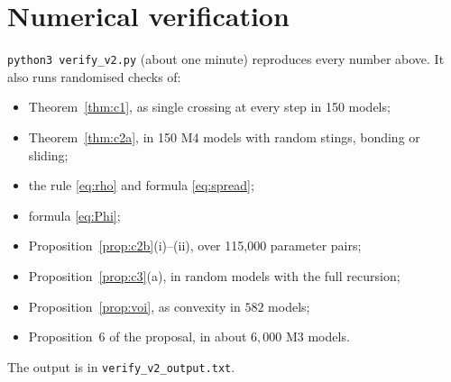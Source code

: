 \documentclass[11pt,a4paper]{article}
\theoremstyle{definition}
\theoremstyle{remark}
\begin{document}
\section*{Numerical verification}
\texttt{python3 verify\_v2.py} (about one minute) reproduces every number above. It also runs randomised checks of:
\begin{itemize}[nosep]
\item Theorem~\ref{thm:c1}, as single crossing at every step in 150 models;
\item Theorem~\ref{thm:c2a}, in 150 M4 models with random stings, bonding or sliding;
\item the rule \eqref{eq:rho} and formula \eqref{eq:spread};
\item formula \eqref{eq:Phi};
\item Proposition~\ref{prop:c2b}(i)--(ii), over 115{,}000 parameter pairs;
\item Proposition~\ref{prop:c3}(a), in random models with the full recursion;
\item Proposition~\ref{prop:voi}, as convexity in $582$ models;
\item Proposition~6 of the proposal, in about $6{,}000$ M3 models.
\end{itemize}
The output is in \texttt{verify\_v2\_output.txt}.
\end{document}
